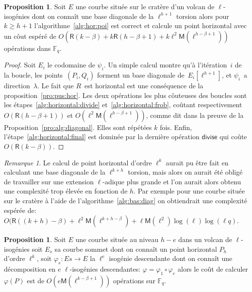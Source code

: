 \documentclass[10pt,a4paper]{book}
\theoremstyle{plain}
\theoremstyle{definition}
\theoremstyle{definition}
\theoremstyle{definition}
\newtheorem{prop}[thm]{Proposition}
\theoremstyle{definition}
\theoremstyle{remark}
\newtheorem{rem}[thm]{Remarque}
\theoremstyle{remark}
\theoremstyle{definition}
\begin{document}
\begin{prop}\label{pro:alg:hor}
Soit $E$ une courbe située sur le cratère d'un volcan de $\ell$-isogénies dont 
on connaît une base diagonale de la $\ell^{h+1}$ torsion alors pour 
$k \geqslant h+1$ l'algorithme~\ref{alg:hor:poi} est correct et calcule un 
point horizontal avec un côut espéré de $O(\mathsf{R}(k-\beta) + k\mathsf{R}(h-\beta+1) + k\ell^2\mathsf{M}(\ell^{h-\beta+1}))$
  opérations dans $\mathbb{F}_q$.
\end{prop}
\begin{proof}
Soit $E_i$ le codomaine de $\psi_i$.
Un simple calcul montre qu'à  l'itération~$i$ de la boucle,
les points~$(P_i, Q_i)$ forment un base diagonale de~$E_i[\ell^{h+1}]$,
et $\psi_i$~a direction~$\lambda$.
Le fait que $R$~est horizontal est une conséquence
de la proposition~\ref{pro:pus:hor}.
Les deux opérations les plus côuteuses des boucles sont les
étapes~\ref{alg:horizontal:divide} et~\ref{alg:horizontal:frob},
coûtant respectivement $O(\mathsf{R}(h-\beta+1))$ et 
$O(\ell^2\mathsf{M}(\ell^{h-\beta+1}))$, comme
dit dans la preuve de la Proposition~\ref{pro:alg:diagonal}. Elles sont 
répétées $k$ fois. Enfin, l'étape~\ref{alg:horizontal:final} est
dominée par la dernière opération $\mathsf{divise}$ qui coûte $O(\mathsf{R}(k-\beta))$.
\end{proof}

\begin{rem}
Le calcul de point horizontal d'ordre $\ell^k$ aurait pu être fait en calculant une base diagonale de la $\ell^{k+h}$ torsion, mais alors on aurait été obligé de travailler sur une extension $\ell$-adique plus grande et l'on aurait alors obtenu une complexité trop élevée en fonction de $h$. Par exemple pour une courbe située sur le cratère à l'aide de l'algorithme~\ref{alg:bas:diag} on obtiendrait une complexité espérée de: $O(\mathsf{R}((k+h)-\beta)+\ell^{2}\mathsf{M}(\ell^{k+h-\beta})+\ell\mathsf{M}(\ell^2)\log(\ell)\log(\ell q)$.
\end{rem}

\begin{prop}
\label{pro:par:hor}
Soit $E$ une courbe située au niveau $h-e$ dans un volcan de $\ell$-isogénies soit $E_s$ sa courbe sommet dont on connaît un point horizontal $P_h$ d'ordre $\ell^k$, soit $\varphi_s:Es \rightarrow E $ la $\ell^{e}$ isogénie descendante dont on connaît une décomposition en $e$ $\ell$-isogénies descendantes: $\varphi=\varphi_1 \circ \varphi_{e}$ alors le coût de calculer $\varphi(P)$ est de $O(e\mathsf{M}(\ell^{k-\beta+1}))$ opérations sur $\mathbb{F}_q$.
\end{prop}
\end{document}
